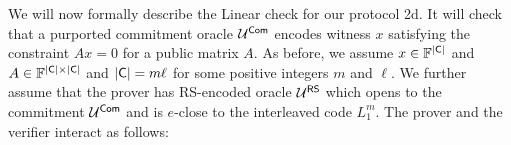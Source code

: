 We will now formally describe the Linear check for our protocol \name2d{}. It will check that a purported commitment oracle $\mathcal{U}^{\mathsf{Com}}$ encodes witness $x$ satisfying the constraint $Ax=0$ for a public matrix $A$. As before, we assume $x\in \mathbb{F}^{|\mathsf{C}|}$ and $A\in \mathbb{F}^{|\mathsf{C}|\times |\mathsf{C}|}$ and
$|\mathsf{C}|=m\ell$ for some positive integers $m$ and $\ell$. We further assume that the prover has RS-encoded oracle $\mathcal{U}^{\mathsf{RS}}$ which opens to the commitment $\mathcal{U}^{\mathsf{Com}}$ and is $e$-close to the interleaved code $L_1^{m}$. The prover and the verifier interact as follows: 
\begin{comment} 
\begin{enumerate}[{\rm 1.}]
\item $\verifier\rightarrow\prover$: The verifier sends a random $r\sample \bbF^N$ to the prover.

\item Both $\verifier$ and $\prover$ compute $R = r^T A$, then interpolate polynomials $R^i:i\in [m]$ in the evaluation domain $G$ such that $R^i$ interpolates the vector $(R_{(i-1)n+1},\ldots,R_{in})$ for $i\in [m]$. 

\item $\prover\rightarrow\verifier$: The prover computes polynomial  $p(\cdot)=\sum_{i\in [m]}R^i(\cdot)\hat{f}^x_{i}(\cdot)$ and sends $p$ to the verifier.

\item $\verifier\rightarrow\prover$: The verifier samples $t$ distinct indices $j_1,\ldots,j_t$ from the set $[n]$ independently at random and sends the indices to the prover.

\item $\prover\leftrightarrow\verifier$: The prover wants to prove that $\sum_{i\in [m]} R^i(\eta_{j_u}) \cdot \rsoracle[i, j_u] = p(\eta_{j_u})$ for each $u \in [t]$.
That is, $\prover$ wants to prove the inner product $\innp{R_{j_u}}{\rsoracle[\cdot,j_u]} = p(\eta_{j_u})$, where $R_{j_u} = (R^1(\eta_{j_u}), \ldots, R^m(\eta_{j_u}))$ and $\rsoracle[\cdot, j_u]$ denotes the $m$-length vector $(\rsoracle[1, j_u], \ldots, \rsoracle[m, j_u])$.
To do so, $\prover$ runs an inner-product argument for each $u \in [t]$ with the verifier. The verifier proceeds if the arguments succeed for all $u \in [t]$.

\item The verifier also checks that $\sum_{k\in [\ell]}p(\zeta_k)=0$.
\item The verifier accepts if all the above checks succeed.
\end{enumerate}
.\dnote{self: write the formal lemma.}.
\dnote{The proof should be straightforward when using zk inner-product arguments, right?}

-----------------------------------------------------------------------------------------------------------------------------------
\end{comment}

